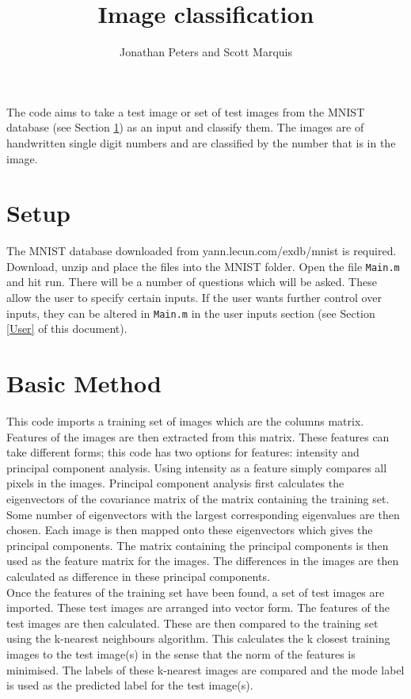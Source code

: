 \documentclass[10pt]{article}
\title{Image classification}
\author{Jonathan Peters and Scott Marquis}
\date{}
\begin{document}
 

\maketitle

The code aims to take a test image or set of test images from the MNIST database (see Section \ref{Setup}) as an input and classify them. The images are of handwritten single digit numbers and are classified by the number that is in the image. 

\section{Setup} \label{Setup}
The MNIST database downloaded from yann.lecun.com/exdb/mnist is required. Download, unzip and place the files into the MNIST folder. Open the file {\tt Main.m} and hit run. There will be a number of questions which will be asked. These allow the user to specify certain inputs. If the user wants further control over inputs, they can be altered in {\tt Main.m} in the user inputs section (see Section \ref{User} of this document). 

\section{Basic Method}
This code imports a training set of images which are the columns matrix. Features of the images are then extracted from this matrix. These features can take different forms; this code has two options for features: intensity and principal component analysis. Using intensity as a feature simply compares all pixels in the images. Principal component analysis first calculates the eigenvectors of the covariance matrix of the matrix containing the training set. Some number of eigenvectors with the largest corresponding eigenvalues are then chosen. Each image is then mapped onto these eigenvectors which gives the principal components. The matrix containing the principal components is then used as the feature matrix for the images. The differences in the images are then calculated as difference in these principal components.  \\ 

Once the features of the training set have been found, a set of test images are imported. These test images are arranged into vector form. The features of the test images are then calculated. These are then compared to the training set using the k-nearest neighbours algorithm. This calculates the k closest training images to the test image(s) in the sense that the norm of the features is minimised. The labels of these k-nearest images are compared and the mode label is used as the predicted label for the test image(s).
\end{document}
